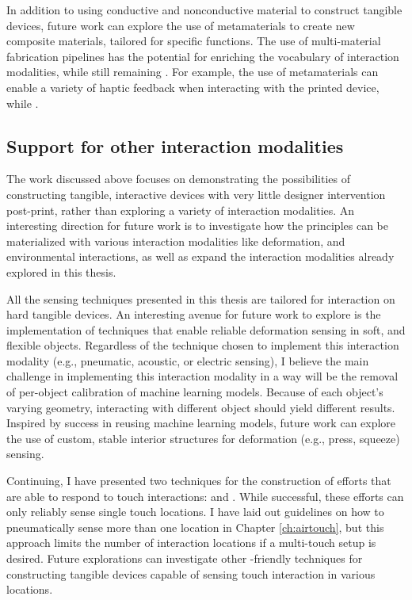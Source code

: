       In addition to using conductive and nonconductive material to construct
      tangible devices, future work can explore the use of metamaterials to
      create new composite materials, tailored for specific functions.  The use
      of multi-material fabrication pipelines has the potential for enriching
      the vocabulary of interaction modalities, while still remaining \pap.  For
      example, the use of  metamaterials can enable a variety
      of haptic feedback when interacting with the printed device, while
      .

    \subsection{Support for other interaction modalities}
      The work discussed above focuses on demonstrating the possibilities of
      constructing tangible, interactive devices with very little designer
      intervention post-print, rather than exploring a variety of interaction
      modalities. An interesting direction for future work is to investigate how
      the \papf principles can be materialized with various interaction
      modalities like deformation, and environmental interactions, as well as
      expand the interaction modalities already explored in this thesis.

      All the sensing techniques presented in this thesis are tailored for
      interaction on hard tangible devices. An interesting avenue for future
      work to explore is the implementation of \pap techniques that enable
      reliable deformation sensing in soft, and flexible objects. Regardless of
      the technique chosen to implement this interaction modality (e.g.,
      pneumatic, acoustic, or electric sensing), I believe the main challenge in
      implementing this interaction modality in a \pap way will be the removal
      of per-object calibration of machine learning models. Because of each
      object's varying geometry, interacting with different object should yield
      different results. Inspired by \at success in reusing machine learning
      models, future work can explore the use of custom, stable interior
      structures for deformation (e.g., press, squeeze) sensing.

      Continuing, I have presented two techniques for the construction of
      efforts that are able to respond to touch interactions: \at and \al. While
      successful, these efforts can only reliably sense single touch locations.
      I have laid out guidelines on how to pneumatically sense more than one
      location in Chapter \ref{ch:airtouch}, but this approach limits the number
      of interaction locations if a multi-touch setup is desired. Future
      explorations can investigate other \pap-friendly techniques for
      constructing tangible devices capable of sensing touch interaction in
      various locations.

